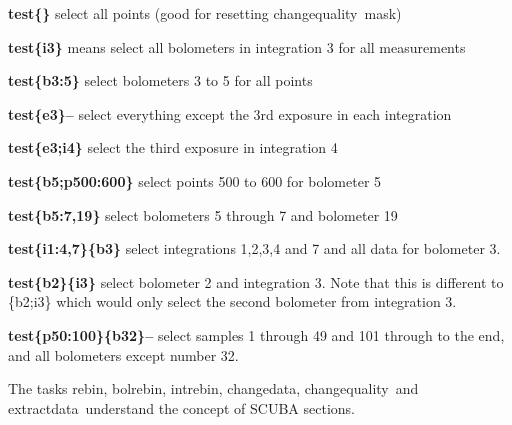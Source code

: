 \documentclass[twoside,11pt]{article}
\newcommand{\task}[1]{{\sf #1}}
\newcommand{\rebin}{\htmlref{\task{rebin}}{REBIN}}
\newcommand{\bolrebin}{\htmlref{\task{bolrebin}}{BOLREBIN}}
\newcommand{\intrebin}{\htmlref{\task{intrebin}}{INTREBIN}}
\newcommand{\chgqual}{\htmlref{\task{change\_quality}}{CHANGE_QUALITY}}
\newcommand{\chgdata}{\htmlref{\task{change\_data}}{CHANGE_DATA}}
\newcommand{\extdata}{\htmlref{\task{extract\_data}}{EXTRACT_DATA}}
\newcommand{\htmlref}[2]{#1}
\renewcommand{\_}{\texttt{\symbol{95}}}
\begin{document}
\begin{description} 

\item \textbf{test\{\}} \newline
          select all points (good for resetting \chgqual\
          mask)

\item \textbf{test\{i3\}} \newline
          means select all bolometers in integration 3 for all
          measurements
 
\item \textbf{test\{b3:5\}} \newline
          select bolometers 3 to 5 for all points
 
\item \textbf{test\{e3\}--} \newline
    select everything except the 3rd exposure in each integration

\item \textbf{test\{e3;i4\}}  \newline
    select the third exposure in integration 4

\item \textbf{test\{b5;p500:600\}} \newline
    select points 500 to 600 for bolometer 5

\item \textbf{test\{b5:7,19\}}   \newline
    select bolometers 5 through 7 and bolometer 19

\item \textbf{test\{i1:4,7\}\{b3\}} \newline
    select integrations 1,2,3,4 and 7 and all data for
    bolometer 3.

\item \textbf{test\{b2\}\{i3\}}\newline
    select bolometer 2 and integration 3. Note that this
    is different to \{b2;i3\} which would only select the second
    bolometer from integration 3.

\item \textbf{test\{p50:100\}\{b32\}--}\newline
    select samples 1 through 49 and 101 through to the end, and
    all bolometers except number 32.

\end{description}

The tasks \rebin, \bolrebin, \intrebin, \chgdata, \chgqual\ and
\extdata\ understand the concept of SCUBA sections.
\end{document}
